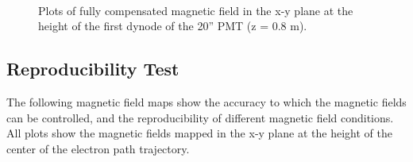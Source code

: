%
%
\begin{figure}[h!]
  \begin{center}
    \\
    \vspace{-3 mm}
  \caption{Plots of fully compensated magnetic field in the x-y plane at the height of the first dynode of the 20'' PMT (z = 0.8 m).}
  \label{fig:bfield_fullcomp800}
  \end{center}
\end{figure}
%


\subsection{Reproducibility Test}
\label{Appendix:ReproducibilityTest}

The following magnetic field maps show the accuracy to which the magnetic fields can be controlled, and the reproducibility of different magnetic field conditions.
All plots show the magnetic fields mapped in the x-y plane at the height of the center of the electron path trajectory.

